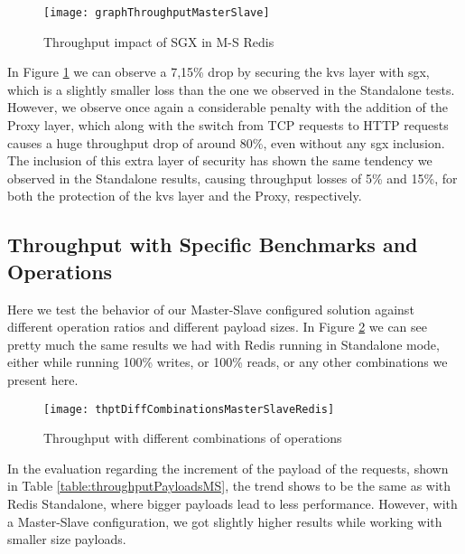 \begin{figure}[htbp]
	\centering
	{\texttt{[image: graphThroughputMasterSlave]}}
	\caption{Throughput impact of SGX in M-S Redis}
	\label{fig:graphTroughputMasterSlave}
\end{figure}

In Figure \ref{fig:graphTroughputMasterSlave} we can observe a 7,15\% drop by securing the \gls{kvs} layer with \gls{sgx}, which is a slightly smaller loss than the one we observed in the Standalone tests. However, we observe once again a considerable penalty with the addition of the Proxy layer, which along with the switch from TCP requests to HTTP requests causes a huge throughput drop of around 80\%, even without any \gls{sgx} inclusion. The inclusion of this extra layer of security has shown the same tendency we observed in the Standalone results, causing throughput losses of 5\% and 15\%, for both the protection of the \gls{kvs} layer and the Proxy, respectively.



\subsection{Throughput with Specific Benchmarks and Operations}

Here we test the behavior of our Master-Slave configured solution against different operation ratios and different payload sizes. 
In Figure \ref{fig:thptDiffCombinationsMasterSlaveRedis} we can see pretty much the same results we had with Redis running in Standalone mode, either while running 100\% writes, or 100\% reads, or any other combinations we present here. 

\begin{figure}[htbp]
	\centering
	{\texttt{[image: thptDiffCombinationsMasterSlaveRedis]}}
	\caption{Throughput with different combinations of operations}
	\label{fig:thptDiffCombinationsMasterSlaveRedis}
\end{figure}

In the evaluation regarding the increment of the payload of the requests, shown in Table \ref{table:throughputPayloadsMS}, the trend shows to be the same as with Redis Standalone, where bigger payloads lead to less performance. However, with a Master-Slave configuration, we got slightly higher results while working with smaller size payloads.

